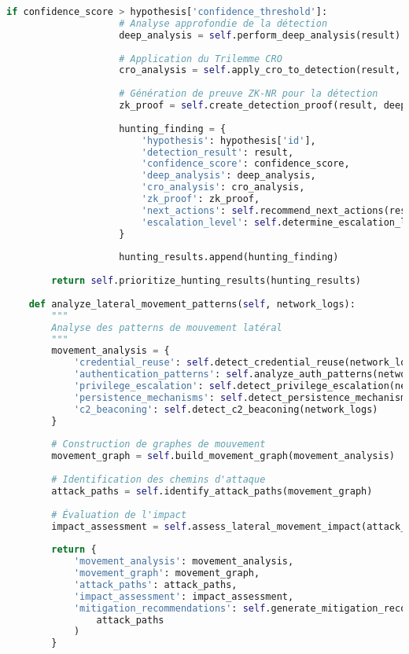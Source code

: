 \begin{lstlisting}[language=Python, caption=Système de threat hunting proactif]
                if confidence_score > hypothesis['confidence_threshold']:
                    # Analyse approfondie de la détection
                    deep_analysis = self.perform_deep_analysis(result)
                    
                    # Application du Trilemme CRO
                    cro_analysis = self.apply_cro_to_detection(result, deep_analysis)
                    
                    # Génération de preuve ZK-NR pour la détection
                    zk_proof = self.create_detection_proof(result, deep_analysis)
                    
                    hunting_finding = {
                        'hypothesis': hypothesis['id'],
                        'detection_result': result,
                        'confidence_score': confidence_score,
                        'deep_analysis': deep_analysis,
                        'cro_analysis': cro_analysis,
                        'zk_proof': zk_proof,
                        'next_actions': self.recommend_next_actions(result),
                        'escalation_level': self.determine_escalation_level(confidence_score)
                    }
                    
                    hunting_results.append(hunting_finding)
                    
        return self.prioritize_hunting_results(hunting_results)
    
    def analyze_lateral_movement_patterns(self, network_logs):
        """
        Analyse des patterns de mouvement latéral
        """
        movement_analysis = {
            'credential_reuse': self.detect_credential_reuse(network_logs),
            'authentication_patterns': self.analyze_auth_patterns(network_logs),
            'privilege_escalation': self.detect_privilege_escalation(network_logs),
            'persistence_mechanisms': self.detect_persistence_mechanisms(network_logs),
            'c2_beaconing': self.detect_c2_beaconing(network_logs)
        }
        
        # Construction de graphes de mouvement
        movement_graph = self.build_movement_graph(movement_analysis)
        
        # Identification des chemins d'attaque
        attack_paths = self.identify_attack_paths(movement_graph)
        
        # Évaluation de l'impact
        impact_assessment = self.assess_lateral_movement_impact(attack_paths)
        
        return {
            'movement_analysis': movement_analysis,
            'movement_graph': movement_graph,
            'attack_paths': attack_paths,
            'impact_assessment': impact_assessment,
            'mitigation_recommendations': self.generate_mitigation_recommendations(
                attack_paths
            )
        }
\end{lstlisting}

